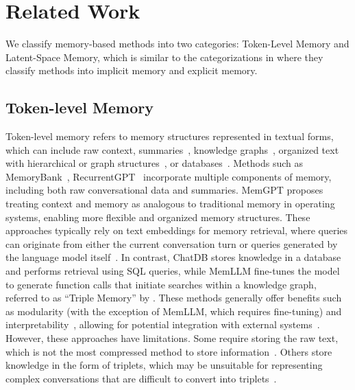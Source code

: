 \section{Related Work}
\vspace{-5pt}
We classify memory-based methods into two categories: Token-Level Memory and Latent-Space Memory, which is similar to the categorizations in \citet{em2} where they classify methods into implicit memory and explicit memory. 

\vspace{-5pt}
\subsection{Token-level Memory}
Token-level memory refers to memory structures represented in textual forms, which can include raw context, summaries~\citep{MemoryBank,zhou2023recurrentgpt}, knowledge graphs~\citep{memgpt,gutierrez2024hipporag}, organized text with hierarchical or graph structures~\citep{memgpt,chen-etal-2024-minprompt}, or databases~\citep{hu2023chatdb}. 
Methods such as MemoryBank~\citep{MemoryBank}, RecurrentGPT~\citep{zhou2023recurrentgpt} incorporate multiple components of memory, including both raw conversational data and summaries. MemGPT \citep{memgpt} proposes treating context and memory as analogous to traditional memory in operating systems, enabling more flexible and organized memory structures. These approaches typically rely on text embeddings for memory retrieval, where queries can originate from either the current conversation turn \citep{MemoryBank,zhou2023recurrentgpt} or queries generated by the language model itself~\citep{memgpt}. In contrast, ChatDB \citep{hu2023chatdb} stores knowledge in a database and performs retrieval using SQL queries, while MemLLM\citep{memllm} fine-tunes the model to generate function calls that initiate searches within a knowledge graph, referred to as ``Triple Memory'' by \citet{memllm}. These methods generally offer benefits such as modularity (with the exception of MemLLM, which requires fine-tuning) and interpretability~\citep{em2}, allowing for potential integration with external systems~\citep{wu2022survey}. However, these approaches have limitations. Some require storing the raw text, which is not the most compressed method to store information~\citep{enhanced_text_compression, nncp_v2, tiny_transformers_for_text_compression}. Others store knowledge in the form of triplets, which may be unsuitable for representing complex conversations that are difficult to convert into triplets~\citep{wang2024large}. 

